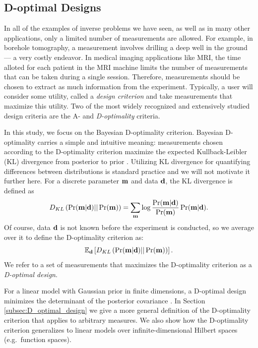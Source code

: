\subsection{D-optimal Designs}\label{subsec:D}
In all of the examples of inverse problems we have seen, as well as in
many other applications, only a limited number of measurements are
allowed. For example, in borehole tomography, a measurement involves
drilling a deep well in the ground --- a very costly endeavor. In
medical imaging applications like MRI, the time alloted for each
patient in the MRI machine limits the number of measurements that can
be taken during a single session. Therefore, measurements should be
chosen to extract as much information from the experiment. Typically,
a user will consider some utility, called a \emph{design criterion}
and take measurements that maximize this utility. Two of the most
widely recognized and extensively studied design criteria are the A-
and \emph{D-optimality} criteria.

In this study, we focus on the Bayesian D-optimality
criterion. Bayesian D-optimality carries a simple and intuitive
meaning: measurements chosen according to the D-optimality criterion
maximize the expected Kullback-Leibler (KL) divergence from posterior
to prior \cite{chaloner1995, AlexanderianGloorGhattas14,
  CoverThomas91}. Utilizing KL divergence for quantifying differences
between distributions is standard practice and we will not motivate it
further here. For a discrete parameter $\mathbf{m}$ and data $\mathbf{d}$, the
KL divergence is defined as
\begin{equation}\label{eq:basic_KL}
  D_{KL}\left (\Pr(\param|\data)||\Pr(\param)\right ) =  \sum_{\param} \log
  \frac{\Pr(\param|\data)}{\Pr(\param)} \Pr(\param|\data). 
\end{equation}
Of course, data $\mathbf{d}$ is not known before the experiment is
conducted, so we average over it to define the D-optimality criterion
as:
\begin{equation*}
  \mathbb{E}_{\data}\left [ D_{KL}\left (\Pr(\param|\data)||\Pr(\param)\right ) \right ].
\end{equation*}
We refer to a set of measurements that maximizes the D-optimality
criterion as a \emph{D-optimal design}.

For a linear model with Gaussian prior in finite dimensions, a
D-optimal design minimizes the determinant of the posterior covariance
\cite{chaloner1995}. In Section \ref{subsec:D_optimal_design} we give
a more general definition of the D-optimality criterion that applies
to arbitrary measures. We also show how the D-optimality criterion
generalizes to linear models over infinite-dimensional Hilbert spaces
(e.g.~function spaces).

